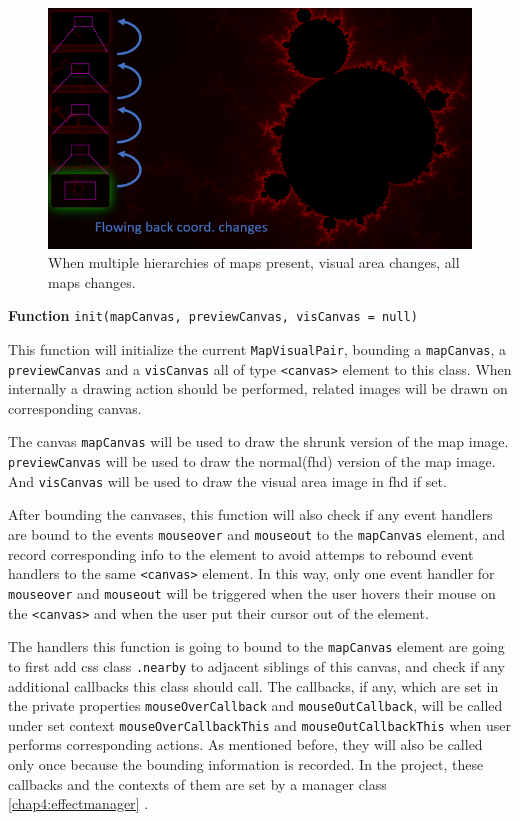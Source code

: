 \begin{figure}[th]
\centering
\includegraphics[width=\textwidth,keepaspectratio]{Figures/Chapter4/mvp-pairflow.png}
\decoRule
\caption[Pairing Multiple Levels of \glspl{map}]{When multiple hierarchies of \glspl{map} present, visual area changes, all \glspl{map} changes.}
\label{fig:mvp-pairflow}
\end{figure}

\textbf{Function} \verb|init(mapCanvas, previewCanvas, visCanvas = null)|

This function will initialize the current \texttt{MapVisualPair}, bounding a \texttt{mapCanvas}, a \texttt{previewCanvas} and a \texttt{visCanvas} all of type \texttt{<canvas>} element to this class. When internally a drawing action should be performed, related images will be drawn on corresponding canvas.

The canvas \texttt{mapCanvas} will be used to draw the shrunk version of the \gls{map} image. \texttt{previewCanvas} will be used to draw the normal(\gls{fhd}) version of the \gls{map} image. And \texttt{visCanvas} will be used to draw the visual area image in \gls{fhd} if set.

After bounding the canvases, this function will also check if any event handlers are bound to the events \texttt{mouseover} and \texttt{mouseout} to the \texttt{mapCanvas} element, and record corresponding info to the element to avoid attemps to rebound event handlers to the same \texttt{<canvas>} element. In this way, only one event handler for \texttt{mouseover} and \texttt{mouseout} will be triggered when the user hovers their mouse on the \texttt{<canvas>} and when the user put their cursor out of the element.

The handlers this function is going to bound to the \texttt{mapCanvas} element are going to first add \gls{css} class \texttt{.nearby} to adjacent siblings of this canvas, and check if any additional callbacks this class should call. The callbacks, if any, which are set in the private properties \texttt{mouseOverCallback} and \texttt{mouseOutCallback}, will be called under set context \texttt{mouseOverCallbackThis} and \texttt{mouseOutCallbackThis} when user performs corresponding actions. As mentioned before, they will also be called only once because the bounding information is recorded. In the project, these callbacks and the contexts of them are set by a manager class \ref{chap4:effectmanager} .

